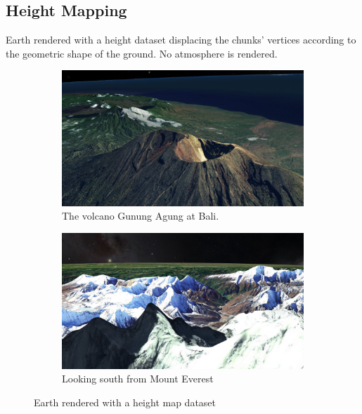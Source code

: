 \subsection{Height Mapping}
\FloatBarrier
Earth rendered with a height dataset displacing the chunks' vertices according to the geometric shape of the ground. No atmosphere is rendered.
\begin{figure}[h]
    \centering
    \begin{subfigure}[bt]{0.9\textwidth}
        \includegraphics[width=\textwidth]{figures/results/screenshots/height_bali.png}
        \caption{The volcano Gunung Agung at Bali.}
    \end{subfigure}
    \begin{subfigure}[bt]{0.9\textwidth}
        \includegraphics[width=\textwidth]{figures/results/screenshots/height_mt_everest.png}
        \caption{Looking south from Mount Everest}
    \end{subfigure}
    \caption{Earth rendered with a height map dataset}
\end{figure}

\clearpage
